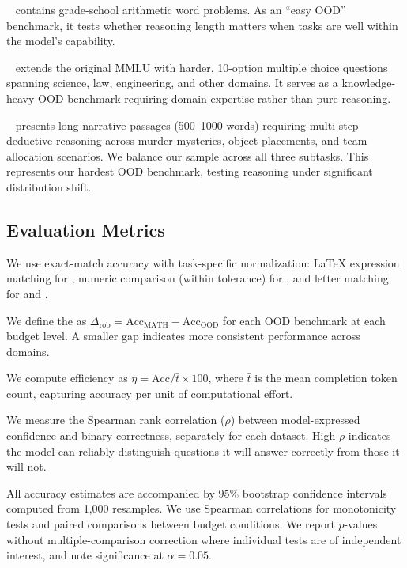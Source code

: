 ~\citep{cobbe2021gsm8k} contains grade-school arithmetic word problems. As an ``easy OOD'' benchmark, it tests whether reasoning length matters when tasks are well within the model's capability.

~\citep{wang2023mmlupro} extends the original MMLU with harder, 10-option multiple choice questions spanning science, law, engineering, and other domains. It serves as a knowledge-heavy OOD benchmark requiring domain expertise rather than pure reasoning.

~\citep{sprague2023musr} presents long narrative passages (500--1000 words) requiring multi-step deductive reasoning across murder mysteries, object placements, and team allocation scenarios. We balance our sample across all three subtasks. This represents our hardest OOD benchmark, testing reasoning under significant distribution shift.

\subsection{Evaluation Metrics}
\label{sec:method:metrics}

 We use exact-match accuracy with task-specific normalization: LaTeX expression matching for \math, numeric comparison (within tolerance) for \gsmk, and letter matching for \mmlupro and \musr.

 We define the \robgap as $\Delta_{\text{rob}} = \text{Acc}_{\text{MATH}} - \text{Acc}_{\text{OOD}}$ for each OOD benchmark at each budget level. A smaller gap indicates more consistent performance across domains.

 We compute efficiency as $\eta = \text{Acc} / \bar{t} \times 100$, where $\bar{t}$ is the mean completion token count, capturing accuracy per unit of computational effort.

 We measure the Spearman rank correlation ($\rho$) between model-expressed confidence and binary correctness, separately for each dataset. High $\rho$ indicates the model can reliably distinguish questions it will answer correctly from those it will not.

 All accuracy estimates are accompanied by 95\% bootstrap confidence intervals computed from 1,000 resamples. We use Spearman correlations for monotonicity tests and paired comparisons between budget conditions. We report $p$-values without multiple-comparison correction where individual tests are of independent interest, and note significance at $\alpha = 0.05$.
